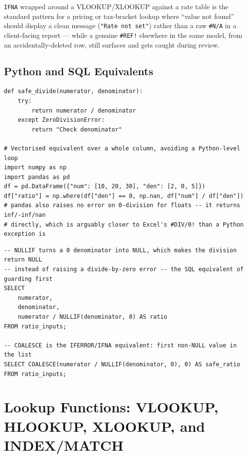 \documentclass[11pt,a4paper]{article}
\begin{document}
\begin{financeapp}
\texttt{IFNA} wrapped around a VLOOKUP/XLOOKUP against a rate table is the standard pattern for a pricing or tax-bracket lookup where ``value not found'' should display a clean message (\texttt{"Rate not set"}) rather than a raw \texttt{\#N/A} in a client-facing report --- while a genuine \texttt{\#REF!} elsewhere in the same model, from an accidentally-deleted row, still surfaces and gets caught during review.
\end{financeapp}

\subsection{Python and SQL Equivalents}

\begin{lstlisting}[style=pythonstyle, caption={try/except as the direct IFERROR equivalent, plus the vectorised pandas idiom}]
def safe_divide(numerator, denominator):
    try:
        return numerator / denominator
    except ZeroDivisionError:
        return "Check denominator"

# Vectorised equivalent over a whole column, avoiding a Python-level loop
import numpy as np
import pandas as pd
df = pd.DataFrame({"num": [10, 20, 30], "den": [2, 0, 5]})
df["ratio"] = np.where(df["den"] == 0, np.nan, df["num"] / df["den"])
# pandas also raises no error on 0-division for floats -- it returns inf/-inf/nan
# directly, which is arguably closer to Excel's #DIV/0! than a Python exception is
\end{lstlisting}

\begin{lstlisting}[style=sqlstyle, caption={NULLIF and COALESCE: SQL's guard-the-denominator and default-value patterns}]
-- NULLIF turns a 0 denominator into NULL, which makes the division return NULL
-- instead of raising a divide-by-zero error -- the SQL equivalent of guarding first
SELECT
    numerator,
    denominator,
    numerator / NULLIF(denominator, 0) AS ratio
FROM ratio_inputs;

-- COALESCE is the IFERROR/IFNA equivalent: first non-NULL value in the list
SELECT COALESCE(numerator / NULLIF(denominator, 0), 0) AS safe_ratio
FROM ratio_inputs;
\end{lstlisting}

\section{Lookup Functions: VLOOKUP, HLOOKUP, XLOOKUP, and INDEX/MATCH}
\label{sec:lookupfunctions}
\end{document}
